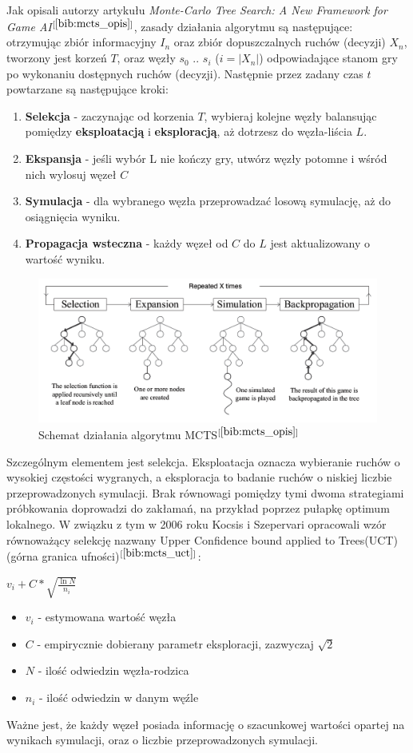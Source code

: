 Jak opisali autorzy artykułu \textit{Monte-Carlo Tree Search: A New Framework for Game AI}$^{[\ref{bib:mcts_opis}]}$, zasady działania algorytmu są następujące: otrzymując zbiór informacyjny $I_n$ oraz zbiór dopuszczalnych ruchów (decyzji) $X_n$, tworzony jest korzeń $T$, oraz węzły $s_0$ .. $s_i$ ($i=|X_n|$) odpowiadające stanom gry po wykonaniu dostępnych ruchów (decyzji). Następnie przez zadany czas $t$ powtarzane są następujące kroki:
\begin{enumerate}
	\item \textbf{Selekcja} - zaczynając od korzenia $T$, wybieraj kolejne węzły balansując pomiędzy \textbf{eksploatacją} i \textbf{eksploracją}, aż dotrzesz do węzła-liścia $L$.
	\item \textbf{Ekspansja} - jeśli wybór L nie kończy gry, utwórz węzły potomne i wśród nich wylosuj węzeł $C$
	\item \textbf{Symulacja} - dla wybranego węzła przeprowadzać losową symulację, aż do osiągnięcia wyniku.
	\item \textbf{Propagacja wsteczna} - każdy węzeł od $C$ do $L$ jest aktualizowany o wartość wyniku.
\end{enumerate}
\begin{figure}[h]
	\centering
	\includegraphics[scale=0.5]{Resources/mcts.png}
	\caption{Schemat działania algorytmu MCTS$^{[\ref{bib:mcts_opis}]}$} 
	\label{fig:llMainImage}
\end{figure}
Szczególnym elementem jest selekcja. Eksploatacja oznacza wybieranie ruchów o wysokiej częstości wygranych, a eksploracja to badanie ruchów o niskiej liczbie przeprowadzonych symulacji. Brak równowagi pomiędzy tymi dwoma strategiami próbkowania doprowadzi do zakłamań, na przykład poprzez pułapkę optimum lokalnego. W związku z tym w 2006 roku Kocsis i Szepervari opracowali wzór równoważący selekcję nazwany Upper Confidence bound applied to Trees(UCT) (górna granica ufności)$^{[\ref{bib:mcts_uct}]}$:
\begin{center}
	${v_i} + C*\sqrt{\frac{\ln{N}}{n_i}}$
\end{center}
\begin{itemize}
	\item $v_i$ - estymowana wartość węzła
	\item $C$ - empirycznie dobierany parametr eksploracji, zazwyczaj $\sqrt{2}$
	\item $N$ - ilość odwiedzin węzła-rodzica
	\item $n_i$ - ilość odwiedzin w danym węźle
\end{itemize}
Ważne jest, że każdy węzeł posiada informację o szacunkowej wartości opartej na wynikach symulacji, oraz o liczbie przeprowadzonych symulacji.

